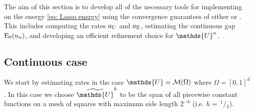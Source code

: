 \documentclass[10pt,a4paper,onecolumn]{article}
\numberwithin{equation}{section}
\let\F\mathds\let\C\mathcal\newcommand{\R}{\F{R}}\newcommand{\A}{\C{A}}
\renewcommand{\sfrac}[2]{\,^{#1}\!\!/\!_{#2}}
\newcommand{\op}[1]{\operatorname{#1}}\newcommand{\overtext}[2]{\stackrel{\text{#1}}{#2}}
\newcommand{\UCmath}[1]{%
	\begingroup
	\ucmathlist\uppercase\expandafter{#1}%
	\endgroup
}
\newcommand{\ucmathlist}{%
	\def\alpha{\mathrm{A}}%
	\def\beta{\mathrm{B}}%
	\let\gamma=\Gamma
	\let\delta=\Delta
	\def\epsilon{\mathrm{E}}%
	\def\varepsilon{\mathrm{E}}%
	\def\zeta{\mathrm{Z}}%
	\def\eta{\mathrm{H}}%
	\let\theta=\Theta
	\let\vartheta=\Theta
	\def\iota{\mathrm{I}}%
	\def\kappa{\mathrm{K}}%
	\let\lambda=\Lambda
	\def\mu{\mathrm{M}}%
	\def\nu{\mathrm{N}}%
	\let\xi=\Xi
	\let\pi=\Pi
	\let\varpi=\Pi
	\def\rho{\mathrm{P}}%
	\def\varrho{\mathrm{P}}%
	\let\sigma=\Sigma
	\def\tau{\mathrm{T}}%
	\let\upsilon=\Upsilon
	\let\phi=\Phi
	\let\varphi=\Phi
	\def\chi{\mathrm{X}}%
	\let\psi=\Psi
	\let\omega=\Omega
}
\newcommand{\caps}[1]{\UCmath{#1}}
\newcommand*{\Func}[1]{%
	\IfEqCase{#1}{%
		{0}{\op{E}}%
		{1}{\op{F}}%
		{2}{\op{G}}%
		{3}{\op{H}}%
	}[\op{F}#1]%
}
\newcommand*{\varf}[1]{%
	\IfEqCase{#1}{%
		{0}{u}%
		{1}{v}%
		{2}{w}%
	}[u#1]%
}
\newcommand*{\spcf}[1]{%
	\IfEqCase{#1}{%
		{0}{\F{U}}%
		{1}{\F{V}}%
		{2}{\F{W}}%
	}[\F{U}#1]%
}
\newcommand*{\vars}[1]{%
	\IfEqCase{#1}{%
		{0}{\alpha}%
		{1}{\beta}%
		{2}{\gamma}%
		{3}{a}%
		{4}{b}%
		{5}{c}%
	}[k#1]%
}
\newcommand{\Domain}{\Omega}
\newcommand{\meshsize}{h}
\newcommand*{\Varf}[1]{\caps{\varf{#1}}}
\begin{document}
The aim of this section is to develop all of the necessary tools for implementing  on the energy \eqref{eq: Lasso energy} using the convergence guarantees of either  or . This includes computing the rates $\vars3_{\Varf0}$ and $\vars3_{\Func0}$, estimating the continuous gap $\Func0_0(\varf0_n)$, and developing an efficient refinement choice for $\spcf0^n$.

\subsection{Continuous case}\label{sec: continuous lasso rate}
We start by estimating rates in the case $\spcf0=\C M(\Domain)$ where $\Domain =[0,1]^d$. In this case we choose $\tilde{\spcf0}^k$ to be the span of all piecewise constant functions on a mesh of squares with maximum side length $2^{-k}$ (i.e. $\meshsize=\sfrac12$). 
\end{document}

